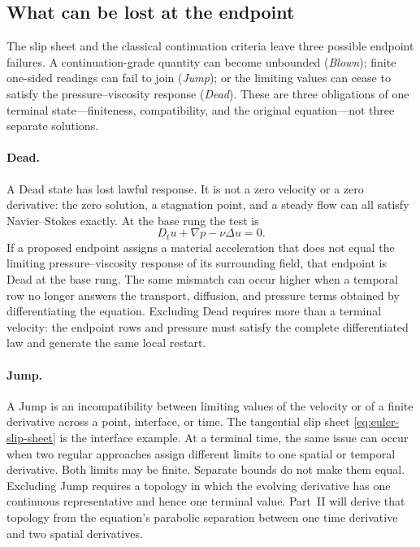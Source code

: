 \subsection{What can be lost at the endpoint}
\label{sec:failure-lenses}

The slip sheet and the classical continuation criteria leave three possible
endpoint failures.  A
continuation-grade quantity can become unbounded (\emph{Blown}); finite
one-sided readings can fail to join (\emph{Jump}); or the limiting values can
cease to satisfy the pressure--viscosity response (\emph{Dead}).  These are
three obligations of one terminal state---finiteness, compatibility, and the
original equation---not three separate solutions.

\paragraph{Dead.}
A Dead state has lost lawful response.  It is not a zero velocity or a zero
derivative: the zero solution, a stagnation point, and a steady flow can all
satisfy Navier--Stokes exactly.  At the base rung the test is
\begin{equation*}
 D_tu+\nabla p-\nu\Delta u=0.
\end{equation*}
If a proposed endpoint assigns a material acceleration that does not equal the
limiting pressure--viscosity response of its surrounding field, that endpoint
is Dead at the base rung.  The same mismatch can occur higher when a temporal
row no longer answers the transport, diffusion, and pressure terms obtained by
differentiating the equation.  Excluding Dead requires more than a
terminal velocity: the endpoint rows and pressure must satisfy the complete
differentiated law and generate the same local restart.

\paragraph{Jump.}
A Jump is an incompatibility between limiting values of the velocity or of a
finite derivative across a point, interface, or time.  The tangential slip
sheet \eqref{eq:euler-slip-sheet} is the interface example.  At a terminal
time, the same issue can occur when two regular approaches assign different
limits to one spatial or temporal derivative.  Both limits may be finite.
Separate bounds do not make them equal.  Excluding Jump requires a topology in
which the evolving derivative has one continuous representative and hence one
terminal value.  Part~II will derive that topology from the equation's
parabolic separation between one time derivative and two spatial derivatives.

